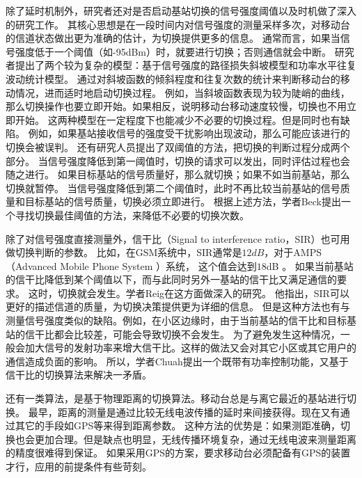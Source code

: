 除了延时机制外，研究者还对是否启动基站切换的信号强度阈值以及时机做了深入的研究工作。
其核心思想是在一段时间内对信号强度的测量采样多次，对移动台的信道状态做出更为准确的估计，为切换提供更多的信息。
通常而言，如果当信号强度低于一个阈值（如-95dBm）时，就要进行切换；否则通信就会中断。
研究者提出了两个较为复杂的模型：基于信号强度的路径损失斜坡模型和功率水平往复波动统计模型\cite{William1995}。
通过对斜坡函数的倾斜程度和往复次数的统计来判断移动台的移动情况，进而适时地启动切换过程。
例如，当斜坡函数表现为较为陡峭的曲线，那么切换操作也要立即开始。如果相反，说明移动台移动速度较慢，切换也不用立即开始。
这两种模型在一定程度下也能减少不必要的切换过程。但是同时也有缺陷。
例如，如果基站接收信号的强度受干扰影响出现波动，那么可能应该进行的切换会被误判。
还有研究人员提出了双阈值的方法，把切换的判断过程分成两个部分。
当信号强度降低到第一阈值时，切换的请求可以发出，同时评估过程也会随之进行。
如果目标基站的信号质量好，那么就切换；如果不如当前基站，那么切换就暂停。
当信号强度降低到第二个阈值时，此时不再比较当前基站的信号质量和目标基站的信号质量，切换必须立即进行。
根据上述方法，学者Beck提出一个寻找切换最佳阈值的方法，来降低不必要的切换次数\cite{40070}。

\par 除了对信号强度直接测量外，信干比（Signal to interference ratio，SIR）也可用做切换判断的参数。
比如，在GSM系统中，SIR通常是$12dB$，对于AMPS（Advanced Mobile Phone System ）系统， 这个值会达到$18$dB \cite{Tripathi2010}。
如果当前基站的信干比降低到某个阈值以下，而与此同时另外一基站的信干比又满足通信的要求。
这时，切换就会发生。学者Reig在这方面做深入的研究\cite{1658431}\cite{1390624}\cite{1370826}。
他指出，SIR可以更好的描述信道的质量，为切换决策提供更为详细的信息。
但是这种方法也有与测量信号强度类似的缺陷。例如，在小区边缘时，由于当前基站的信干比和目标基站的信干比都会比较差，可能会导致切换不会发生。
为了避免发生这种情况，一般会加大信号的发射功率来增大信干比。这样的做法又会对其它小区或其它用户的通信造成负面的影响。
所以，学者Chuah提出一个既带有功率控制功能，又基于信干比的切换算法来解决一矛盾\cite{504935}。


\par 还有一类算法，是基于物理距离的切换算法。移动台总是与离它最近的基站进行切换。
最早，距离的测量是通过比较无线电波传播的延时来间接获得\cite{Rolle1986}。现在又有通过其它的手段如GPS等来得到距离参数\cite{5349100}\cite{4534769}。
这种方法的优势是：如果测距准确，切换也会更加合理。但是缺点也明显，无线传播环境复杂，通过无线电波来测量距离的精度很难得到保证。
如果采用GPS的方案，要求移动台必须配备有GPS的装置才行，应用的前提条件有些苛刻。

